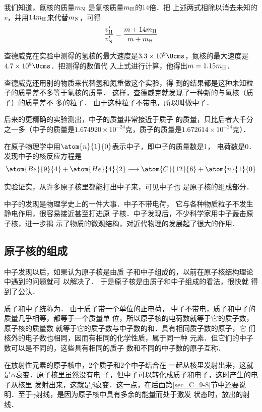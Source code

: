 我们知道，氮核的质量$m_{\rm N}$
是氢核质量$m_{\rm H}$的14倍．把
上述两式相除以消去未知的$v$，并用$14m_{\rm H}$来代替$m_{\rm N}$，可得
\[ \frac{v'_{\rm H}}{v'_{\rm N}} =\frac{m+14m_{\rm H}}{m+m_{\rm H}}\]

查德威克在实验中测得的氢核的最大速度是$3.3\times10^9 \Ucms $，氮核的最大速度是$4.7\times10^8 \Ucms $．把测得的数值代
入上式进行计算，他得出$m=1.15m_{\rm H}$．

查德威克还用别的物质来代替氢和氮重做这个实验，得
到的结果都是这种未知粒子的质量差不多等于氢核的质量．
这样，查德威克就发现了一种新的与氢核（质子）的质量差不
多的粒子．
由于这种粒子不带电，所以叫做中子．

后来的更精确的实验测出，中子的质量非常接近于质子
的质量，只比后者大千分之一多（中子的质量是$1.674920\times
10^{-24}$克，质子的质量是$1.672614\times10^{-24}$克）．

在原子物理学中用$\atom{n}{1}{0}$表示中子，即中子的质量数是1，
电荷数是0．发现中子的核反应方程是
\[\atom{Be}{9}{4}+\atom{He}{4}{2}\longrightarrow \atom{C}{12}{6}+\atom{n}{1}{0}  \]

实验证实，从许多原子核里都能打出中子来，可见中子也
是原子核的组成部分．

中子的发现是物理学史上的一件大事．中子不带电荷，
它与各种物质粒子不发生静电作用，很容易接近甚至打进原
子核．中子发现后，不少科学家用中子轰击原子核，进一步揭
示了物质的微观结构，对近代物理的发展起了很大的作用．

\subsection{原子核的组成}

中子发现以后，如果认为原子核是由质
子和中子组成的，以前在原子核结构理论中遇到的问题就可
以解决了．
于是原子核是由质子和中子组成的看法，很快就
得到了公认．

质子和中子统称为．
由于质子带一个单位的正电荷，
中子不带电，质子和中子的质量几乎相等，都等于一个质量单
位，所以原子核的电荷数就等于它的质子数，原子核的质量数
就等于它的质子数与中子数的和．具有相同质子数的原子，它
们核外的电子数也相同，因而有相同的化学性质，属于同一种
元素．但它们的中子数可以是不同的，这些具有相同的质子
数和不同的中子数的原子互称．

在放射性元素的原子核中，2个质子和2个中子结合在
一起从核里发射出来，这就是$\alpha$衰变．原子核里虽然没有电
子，但中子可以转化成质子和电子，这时产生的电子从核里
发射出来，这就是$\beta$衰变．这一点，在后面第\ref{sec_C_9-8}节中还要说
明．至于$\gamma$射线，是因为原子核中具有多余的能量而处于激发
状态时，放出的射线．


